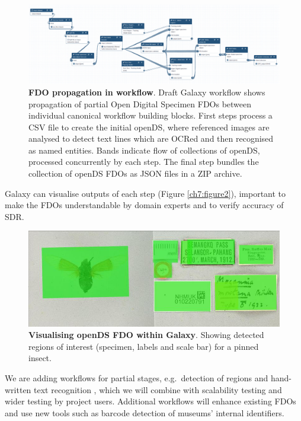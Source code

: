 \begin{figure}%
    \includegraphics[width=\textwidth]{figures/ch07/figure1.png}
	\caption[FDO propagation in workflow]{\textbf{FDO propagation in workflow}. 
    Draft Galaxy workflow \cite{Brack 2022b} 
    shows propagation of partial Open Digital Specimen FDOs between
    individual canonical workflow building blocks. First steps process a CSV
    file to create the initial openDS, where referenced images are analysed
    to detect text lines which are OCRed and then recognised as named
    entities. Bands indicate flow of collections of openDS, processed
    concurrently by each step. The final step bundles the collection of
    openDS FDOs as JSON files in a ZIP archive.}
    \label{ch7:figure1}
  \end{figure}

Galaxy can visualise outputs of each step
(Figure \vref{ch7:figure2}), important to make the
FDOs understandable by domain experts and to verify accuracy of SDR.

\begin{figure}%
    \includegraphics[width=\textwidth]{figures/ch07/figure2.jpg}
	\caption[Visualising openDS FDO within Galaxy]{\textbf{Visualising openDS FDO within Galaxy}.
    Showing detected regions of interest
    (specimen, labels and scale bar) for a pinned insect.}
    \label{ch7:figure2}
\end{figure}

We are adding workflows for partial stages, e.g.~detection of regions
\cite{Livermore 2022a} and hand-written text recognition
\cite{Livermore 2022b}, which we will combine with scalability testing and wider
testing by project users. Additional workflows will enhance existing
FDOs and use new tools such as barcode detection of museums' internal
identifiers.

